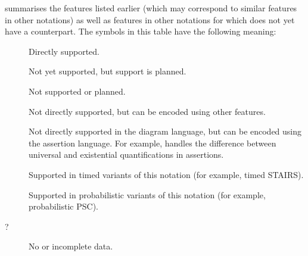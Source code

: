  summarises the \langname{} features listed earlier
(which may correspond to similar features in other
notations) as well as features in other notations for which \langname{} does not yet have a counterpart.
The symbols in this table have the following meaning:

\begin{description}
\item[\OK] Directly supported.
\item[\SOON] Not yet supported, but
  support is planned.
\item[\NO] Not supported or planned.
\item[\ISH] Not directly supported, but can be encoded using other
  features.
\item[\ASST] Not directly supported in the
  diagram language, but can be encoded using the
  assertion language.  For example, \langname{} handles
  the difference between universal and existential
  quantifications in assertions.
\item[\INTIMED] Supported in timed variants of this
  notation (for example, timed STAIRS).
\item[\INPROB] Supported in
  probabilistic variants of this
  notation (for example, probabilistic PSC). 
\item[?] No or incomplete data.
\end{description}

